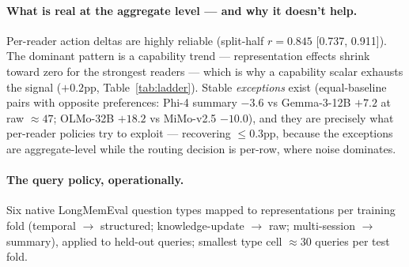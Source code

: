 \paragraph{What is real at the aggregate level --- and why it doesn't help.}
Per-reader action deltas are highly reliable (split-half $r = 0.845$ [0.737,
0.911]). The dominant pattern is a capability trend --- representation effects
shrink toward zero for the strongest readers --- which is why a capability
scalar exhausts the signal ($+0.2$pp, Table~\ref{tab:ladder}). Stable
\emph{exceptions} exist (equal-baseline pairs with opposite preferences: Phi-4
summary $-3.6$ vs Gemma-3-12B $+7.2$ at raw $\approx 47$; OLMo-32B $+18.2$ vs
MiMo-v2.5 $-10.0$), and they are precisely what per-reader policies try to
exploit --- recovering $\le0.3$pp, because the exceptions are aggregate-level
while the routing decision is per-row, where noise dominates.

\paragraph{The query policy, operationally.} Six native LongMemEval question
types mapped to representations per training fold (temporal $\rightarrow$
structured; knowledge-update $\rightarrow$ raw; multi-session $\rightarrow$
summary), applied to held-out queries; smallest type cell $\approx 30$ queries
per test fold.
